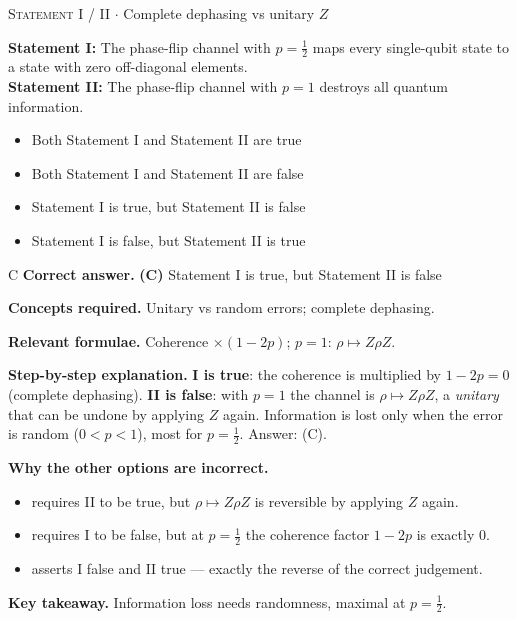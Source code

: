 \documentclass[11pt,a4paper]{article}
\newcommand{\optlabel}[1]{\textbf{(#1)}}
\newcommand{\correctlabel}[1]{\textcolor{okgreen}{\textbf{(#1)}\,\ding{51}}}
\newenvironment{qitem}[1]{\begin{list}{}{\setlength{\leftmargin}{3.3em}\setlength{\labelwidth}{3.1em}%
  \setlength{\labelsep}{0.2em}\setlength{\topsep}{3pt}\setlength{\parsep}{3pt}}\item[\textbf{Q.#1}\hfill]}{\end{list}}
\newcommand{\qsep}{\par\vspace{2pt}{\color{black!15}\hrule}\vspace{4pt}}
\newcommand{\qmeta}[2]{{\footnotesize\color{black!60}\textsc{#1} \;$\cdot$\; #2}\par}
\begin{document}
\begin{qitem}{38}
\qmeta{Statement I / II}{Complete dephasing vs unitary $Z$}
\textbf{Statement I:} The phase-flip channel with $p = \frac12$ maps every single-qubit state to a state with zero off-diagonal elements.\\[1mm]
\textbf{Statement II:} The phase-flip channel with $p = 1$ destroys all quantum information.
\begin{itemize}[leftmargin=2.6em, labelsep=0.4em, itemsep=2pt, topsep=3pt]
\item[\optlabel{A}] Both Statement I and Statement II are true
\item[\optlabel{B}] Both Statement I and Statement II are false
\item[\correctlabel{C}] Statement I is true, but Statement II is false
\item[\optlabel{D}] Statement I is false, but Statement II is true
\end{itemize}
\end{qitem}
\begin{solbox}{C}
\textbf{\color{brand}Correct answer.} \textcolor{okgreen}{\textbf{(C)}} Statement I is true, but Statement II is false

\textbf{\color{brand}Concepts required.} Unitary vs random errors; complete dephasing.

\textbf{\color{brand}Relevant formulae.} Coherence $\times(1 - 2p)$; $p = 1$: $\rho \mapsto Z\rho Z$.

\textbf{\color{brand}Step-by-step explanation.} \textbf{I is true}: the coherence is multiplied by $1 - 2p = 0$ (complete dephasing). \textbf{II is false}: with $p = 1$ the channel is
$\rho \mapsto Z\rho Z$, a \emph{unitary} that can be undone by applying $Z$ again. Information is lost only when the error is random ($0 < p < 1$),
most for $p = \frac12$. Answer: (C).

\textbf{\color{brand}Why the other options are incorrect.}
\begin{itemize}[leftmargin=2.4em, itemsep=1pt, topsep=2pt]
\item[\textbf{(A)}] requires II to be true, but $\rho \mapsto Z\rho Z$ is reversible by applying $Z$ again.
\item[\textbf{(B)}] requires I to be false, but at $p = \frac12$ the coherence factor $1 - 2p$ is exactly 0.
\item[\textbf{(D)}] asserts I false and II true --- exactly the reverse of the correct judgement.
\end{itemize}
\textbf{\color{brand}Key takeaway.} Information loss needs randomness, maximal at $p = \frac12$.
\end{solbox}
\qsep
\end{document}
